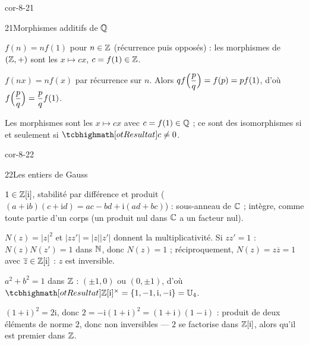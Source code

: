 \begin{blocLivre}{cor-8-21}
\begin{corrige}{21}{Morphismes additifs de $\mathbb{Q}$}
\begin{questions}
  \item $f(n)=nf(1)$ pour $n\in\mathbb{Z}$ (récurrence puis opposés) : les
    morphismes de $(\mathbb{Z},+)$ sont les $x\mapsto cx$, $c=f(1)\in\mathbb{Z}$.
  \item $f(nx)=nf(x)$ par récurrence sur $n$. Alors
    $qf\Bigl(\dfrac{p}{q}\Bigr)=f(p)=pf(1)$, d'où
    $f\Bigl(\dfrac{p}{q}\Bigr)=\dfrac{p}{q}f(1)$.
  \item Les morphismes sont les $x\mapsto cx$ avec $c=f(1)\in\mathbb{Q}$ ;
    ce sont des isomorphismes si et seulement si $\res{c\neq0}$.
\end{questions}
\end{corrige}
\end{blocLivre}

\begin{blocLivre}{cor-8-22}
\begin{corrige}{22}{Les entiers de Gauss}
\begin{questions}
  \item $1\in\mathbb{Z}[\mathrm{i}]$, stabilité par différence et produit
    ($(a+\mathrm{i}b)(c+\mathrm{i}d)=ac-bd+\mathrm{i}(ad+bc)$) :
    sous-anneau de $\mathbb{C}$ ; intègre, comme toute partie d'un corps (un
    produit nul dans $\mathbb{C}$ a un facteur nul).
  \item $N(z)=|z|^{2}$ et $|zz'|=|z||z'|$ donnent la multiplicativité.
    Si $zz'=1$ : $N(z)N(z')=1$ dans $\mathbb{N}$, donc $N(z)=1$ ; réciproquement,
    $N(z)=z\overline{z}=1$ avec $\overline{z}\in\mathbb{Z}[\mathrm{i}]$ : $z$ est
    inversible.
  \item $a^{2}+b^{2}=1$ dans $\mathbb{Z}$ : $(\pm1,0)$ ou $(0,\pm1)$, d'où
    $\res{\Z[\mathrm{i}]^{\times}=\ens{1,-1,\mathrm{i},-\mathrm{i}}=\mathbb{U}_4}$.
  \item $(1+\mathrm{i})^{2}=2\mathrm{i}$, donc
    $2=-\mathrm{i}(1+\mathrm{i})^{2}=(1+\mathrm{i})(1-\mathrm{i})$ :
    produit de deux éléments de norme $2$, donc non inversibles — $2$ se
    factorise dans $\mathbb{Z}[\mathrm{i}]$, alors qu'il est premier dans $\mathbb{Z}$.
\end{questions}
\end{corrige}
\end{blocLivre}

